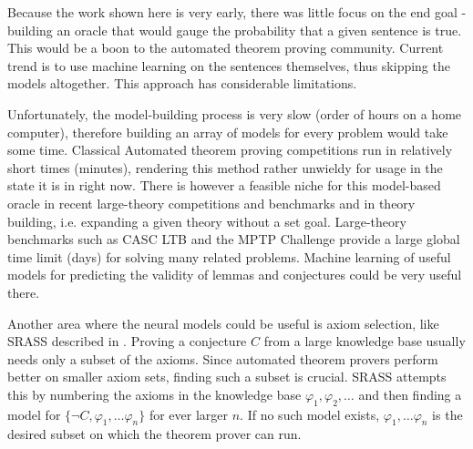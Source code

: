 Because the work shown here is very early, there was little focus on the end goal - building an oracle that would gauge the probability that a given sentence is true. This would be a boon to the automated theorem proving community. Current trend is to use machine learning on the sentences themselves, thus skipping the models altogether. This approach has considerable limitations.

Unfortunately, the model-building process is very slow (order of hours on a home computer), therefore building an array of models for every problem would take some time. Classical Automated theorem proving competitions run in relatively short times (minutes), rendering this method rather unwieldy for usage in the state it is in right now. There is however a feasible niche for this model-based oracle in recent large-theory competitions and benchmarks and in theory building, i.e. expanding a given theory without a set goal. Large-theory benchmarks such as CASC LTB and the MPTP Challenge provide a large global time limit (days) for solving many related
problems. Machine learning of useful models for predicting the
validity of lemmas and conjectures could be very useful there.

Another area where the neural models could be useful is axiom selection, like SRASS described in \cite{model_axiom_selection}. Proving a conjecture $C$ from a large knowledge base usually needs only a subset of the axioms. Since automated theorem provers perform better on smaller axiom sets, finding such a subset is crucial. SRASS attempts this by numbering the axioms in the knowledge base $\varphi_1,\varphi_2,\dots$ and then finding a model for $\{\neg C,\varphi_1,\dots \varphi_n\}$ for ever larger $n$. If no such model exists, $\varphi_1,\dots \varphi_n$ is the desired subset on which the theorem prover can run.